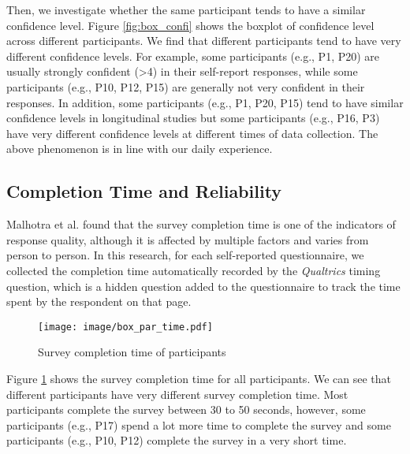 \documentclass[sigconf]{acmart}
\begin{document}
Then, we investigate whether the same participant tends to have a similar confidence level. Figure \ref{fig:box_confi} shows the boxplot of confidence level across different participants. We find that different participants tend to have very different confidence levels. For example,  some participants (e.g., P1, P20) are usually strongly confident (>4) in their self-report responses, while some participants (e.g., P10, P12, P15) are generally not very confident in their responses. In addition, some participants (e.g., P1, P20, P15) tend to have similar confidence levels in longitudinal studies but some participants (e.g., P16, P3) have very different confidence levels at different times of data collection. The above phenomenon is in line with our daily experience.




\subsection{Completion Time and Reliability}

Malhotra et al. \cite{malhotra2008completion} found that the survey completion time is one of the indicators of response quality, although it is affected by multiple factors and varies from person to person. In this research, for each self-reported questionnaire, we collected the completion time automatically recorded by the \textit{Qualtrics} timing question, which is a hidden question added to the questionnaire to track the time spent by the respondent on that page. 

\begin{figure}
    \centering
    \texttt{[image: image/box\_par\_time.pdf]}
    \caption{Survey completion time of participants}
    \label{fig:box_time}
\end{figure}

Figure \ref{fig:box_time} shows the survey completion time for all participants. We can see that different participants have very different survey completion time. Most participants complete the survey between 30 to 50 seconds, however, some participants (e.g., P17) spend a lot more time to complete the survey and some participants (e.g., P10, P12) complete the survey in a very short time.

\end{document}
